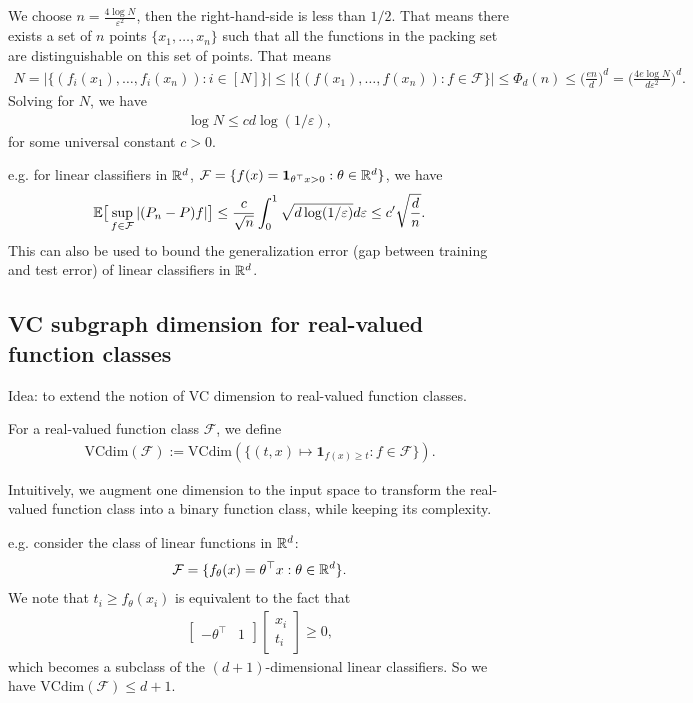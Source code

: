 \documentclass[11pt,letterpaper]{article}
\numberwithin{theorem}{lecture}
\numberwithin{proposition}{lecture}
\numberwithin{lemma}{lecture}
\numberwithin{claim}{lecture}
\numberwithin{corollary}{lecture}
\numberwithin{definition}{lecture}
\numberwithin{conjecture}{lecture}
\numberwithin{remark}{lecture}
\numberwithin{example}{lecture}
\numberwithin{equation}{lecture}
\begin{document}
We choose $n = \frac{4 \log N}{\varepsilon^2}$, then the right-hand-side is less than $1/2$. That means there exists a set of $n$ points $\{x_1, \ldots, x_n\}$ such that all the functions in the packing set are distinguishable on this set of points. That means
\begin{align*}
  N = \Big| \Big\{ (f_i (x_1), \ldots, f_i (x_n)) : i \in [N]\Big\} \Big| \leq \Big| \Big\{ (f (x_1), \ldots, f (x_n)) : f \in \mathcal{F}\Big\} \Big| \leq \Phi_d (n) \leq \Big( \frac{e n}{d} \Big)^d = \Big( \frac{4 e \log N}{d \varepsilon^2} \Big)^d.
\end{align*}
Solving for $N$, we have
\begin{align*}
  \log N \leq c d \log (1/\varepsilon),
\end{align*}
for some universal constant $c > 0$.

e.g. for linear classifiers in $\mathbb{R}^d$, $\mathcal{F} = \{ f(x) = \bm{1}_{\theta^\top x > 0} : \theta \in \mathbb{R}^d  \}$, we have
\begin{align*}
  {\mathbb{E}} \big[ \sup_{f \in \mathcal{F}}|(P_n - P) f| \big] \leq \frac{c}{\sqrt{n}} \int_0^1 \sqrt{d \log (1/ \varepsilon)} d \varepsilon \leq c' \sqrt{\frac{d}{n}}.
\end{align*}
This can also be used to bound the generalization error (gap between training and test error) of linear classifiers in $\mathbb{R}^d$.

\subsection{VC subgraph dimension for real-valued function classes}
Idea: to extend the notion of VC dimension to real-valued function classes.

\begin{definition}
  For a real-valued function class $\mathcal{F}$, we define
  \begin{align*}
    \text{VCdim} (\mathcal{F}) := \text{VCdim} (\{ (t, x) \mapsto \bm{1}_{f(x) \geq t}: f \in \mathcal{F}\}).
  \end{align*}
\end{definition}
Intuitively, we augment one dimension to the input space to transform the real-valued function class into a binary function class, while keeping its complexity.

e.g. consider the class of linear functions in $\mathbb{R}^d$:
\begin{align*}
  \mathcal{F} = \{ f_\theta (x) = \theta^\top x: \theta \in \mathbb{R}^d\}.
\end{align*}
We note that $t_i \geq f_\theta (x_i)$ is equivalent to the fact that
\begin{align*}
  \begin{bmatrix}
    -\theta^\top & 1
  \end{bmatrix} \begin{bmatrix}
    x_i\\
    t_i
  \end{bmatrix} \geq 0,
\end{align*}
which becomes a subclass of the $(d + 1)$-dimensional linear classifiers. So we have $\text{VCdim} (\mathcal{F}) \leq d + 1$.
\end{document}
